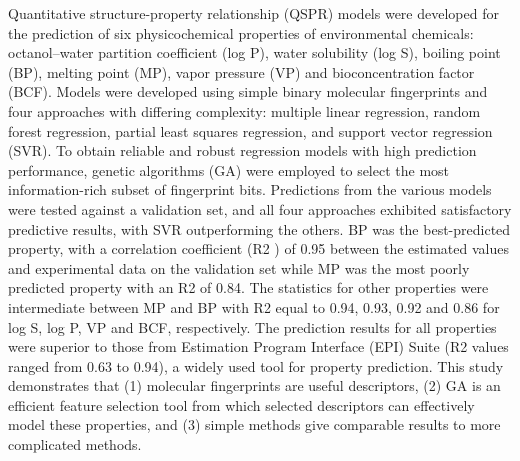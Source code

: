 Quantitative structure-property relationship (QSPR) models were developed for the
prediction of six physicochemical properties of environmental chemicals: octanol–water
partition coefficient (log P), water solubility (log S), boiling point (BP), melting point (MP),
vapor pressure (VP) and bioconcentration factor (BCF). Models were developed using
simple binary molecular fingerprints and four approaches with differing complexity: multiple
linear regression, random forest regression, partial least squares regression, and support
vector regression (SVR). To obtain reliable and robust regression models with high
prediction performance, genetic algorithms (GA) were employed to select the most
information-rich subset of fingerprint bits. Predictions from the various models were tested
against a validation set, and all four approaches exhibited satisfactory predictive results, with
SVR outperforming the others. BP was the best-predicted property, with a correlation
coefficient (R2
) of 0.95 between the estimated values and experimental data on the
validation set while MP was the most poorly predicted property with an R2 of 0.84. The
statistics for other properties were intermediate between MP and BP with R2 equal to 0.94,
0.93, 0.92 and 0.86 for log S, log P, VP and BCF, respectively. The prediction results for all
properties were superior to those from Estimation Program Interface (EPI) Suite (R2 values
ranged from 0.63 to 0.94), a widely used tool for property prediction. This study
demonstrates that (1) molecular fingerprints are useful descriptors, (2) GA is an efficient
feature selection tool from which selected descriptors can effectively model these properties,
and (3) simple methods give comparable results to more complicated methods.
